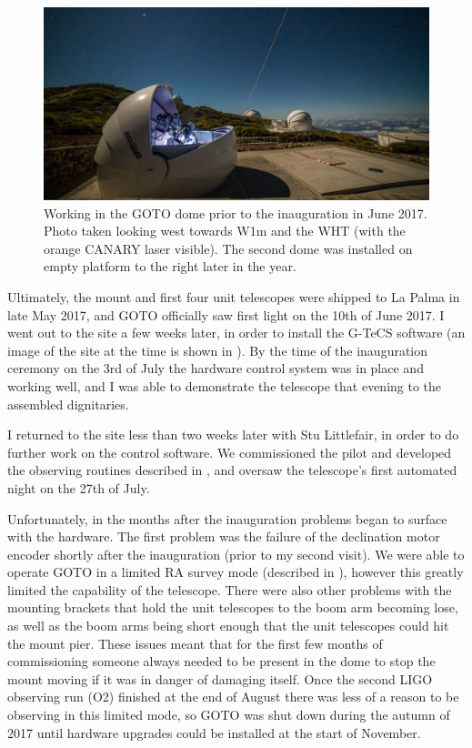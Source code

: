 \begin{colsection}
\begin{figure}[t]
    \begin{center}
        \includegraphics[width=\linewidth]{images/inauguration_photo.jpg}
    \end{center}
    \caption[Working in the GOTO dome prior to the inauguration in June 2017]{
        Working in the GOTO dome prior to the inauguration in June 2017.
        Photo taken looking west towards W1m and the WHT (with the orange CANARY laser visible). The second dome was installed on empty platform to the right later in the year.
    }\label{fig:inauguration}
\end{figure}

Ultimately, the mount and first four unit telescopes were shipped to La Palma in late May 2017, and GOTO officially saw first light on the 10th of June 2017. I went out to the site a few weeks later, in order to install the G-TeCS software (an image of the site at the time is shown in ). By the time of the inauguration ceremony on the 3rd of July the hardware control system was in place and working well, and I was able to demonstrate the telescope that evening to the assembled dignitaries.

I returned to the site less than two weeks later with Stu Littlefair, in order to do further work on the control software. We commissioned the pilot and developed the observing routines described in , and oversaw the telescope's first automated night on the 27th of July.

Unfortunately, in the months after the inauguration problems began to surface with the hardware. The first problem was the failure of the declination motor encoder shortly after the inauguration (prior to my second visit). We were able to operate GOTO in a limited RA survey mode (described in ), however this greatly limited the capability of the telescope. There were also other problems with the mounting brackets that hold the unit telescopes to the boom arm becoming lose, as well as the boom arms being short enough that the unit telescopes could hit the mount pier. These issues meant that for the first few months of commissioning someone always needed to be present in the dome to stop the mount moving if it was in danger of damaging itself. Once the second LIGO observing run (O2) finished at the end of August there was less of a reason to be observing in this limited mode, so GOTO was shut down during the autumn of 2017 until hardware upgrades could be installed at the start of November.


\end{colsection}
